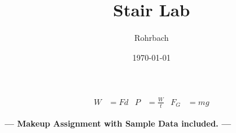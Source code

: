 \documentclass[10pt]{exam}
\title{Stair Lab}
\author{Rohrbach}
\date{\today}
\begin{document}
\maketitle


\newcommand{\printeqs}{
  \begin{align*}
    W   &= F d          & 
    P   &= \frac{W}{t}  &
    F_G &= mg
  \end{align*}

  \vspace{-2em}
}

\vspace{-2em}
\printeqs
\vspace{-2em}

\ifprintanswers
  \vspace{3em}

  \begin{center}
    \large \color{red} \bf --- Makeup Assignment with Sample Data included. ---
  \end{center}

  \vspace{-2em}

\fi
\end{document}
